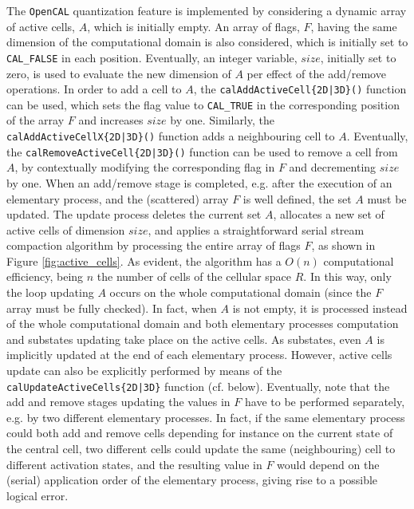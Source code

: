 The \texttt{OpenCAL} quantization feature is implemented by considering a
dynamic array of active cells, $A$, which is initially empty. An
array of flags, $F$, having the same dimension of the computational
domain is also considered, which is initially set to
\verb'CAL_FALSE' in each position. Eventually, an integer variable,
$size$, initially set to zero, is used to evaluate the new dimension
of $A$ per effect of the add/remove operations. In order to add a
cell to $A$, the \verb'calAddActiveCell{2D|3D}()' function can be
used, which sets the flag value to \verb'CAL_TRUE' in the
corresponding position of the array $F$ and increases $size$ by
one. Similarly, the \verb'calAddActiveCellX{2D|3D}()' function adds
a neighbouring cell to $A$. Eventually, the
\verb'calRemoveActiveCell{2D|3D}()' function can be used to remove a
cell from $A$, by contextually modifying the corresponding flag in
$F$ and decrementing $size$ by one. When an add/remove stage is
completed, e.g. after the execution of an elementary process, and
the (scattered) array $F$ is well defined, the set $A$ must be
updated. The update process deletes the current set $A$, allocates a
new set of active cells of dimension $size$, and applies a
straightforward serial stream compaction algorithm by processing the
entire array of flags $F$, as shown in Figure
\ref{fig:active_cells}. As evident, the algorithm has a $O(n)$
computational efficiency, being $n$ the number of cells of the
cellular space $R$. In this way, only the loop updating $A$ occurs
on the whole computational domain (since the $F$ array must be fully
checked). In fact, when $A$ is not empty, it is processed instead of
the whole computational domain and both elementary processes
computation and substates updating take place on the active
cells. As substates, even $A$ is implicitly updated at the end of
each elementary process. However, active cells update can also be
explicitly performed by means of the
\verb'calUpdateActiveCells{2D|3D}' function (cf. below).
Eventually, note that the add and remove stages updating the values
in $F$ have to be performed separately, e.g. by two different
elementary processes. In fact, if the same elementary process could
both add and remove cells depending for instance on the current
state of the central cell, two different cells could update the same
(neighbouring) cell to different activation states, and the
resulting value in $F$ would depend on the (serial) application
order of the elementary process, giving rise to a possible logical
error.

